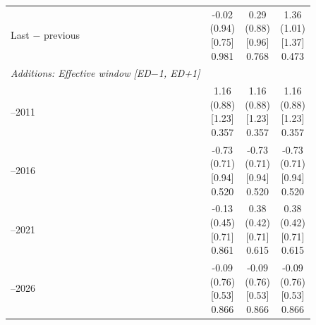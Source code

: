 \begin{threeparttable}
\begin{tabular}{@{}lccc}
\addlinespace[0.25ex]
\addlinespace[0.25ex]
Last $-$ previous & \makecell{-0.02\\(0.94)\\{}[0.75]\\{0.981}} & \makecell{0.29\\(0.88)\\{}[0.96]\\{0.768}} & \makecell{1.36\\(1.01)\\{}[1.37]\\{0.473}} \\
\addlinespace[0.25ex]
\midrule
\emph{Additions: Effective window [ED$-$1, ED+1]} \\
\addlinespace[0.25ex]
\addlinespace[1ex]
2007–2011 & \makecell{1.16\\(0.88)\\{}[1.23]\\{0.357}} & \makecell{1.16\\(0.88)\\{}[1.23]\\{0.357}} & \makecell{1.16\\(0.88)\\{}[1.23]\\{0.357}} \\
\addlinespace[0.25ex]
\addlinespace[0.25ex]
2012–2016 & \makecell{-0.73\\(0.71)\\{}[0.94]\\{0.520}} & \makecell{-0.73\\(0.71)\\{}[0.94]\\{0.520}} & \makecell{-0.73\\(0.71)\\{}[0.94]\\{0.520}} \\
\addlinespace[0.25ex]
\addlinespace[0.25ex]
2017–2021 & \makecell{-0.13\\(0.45)\\{}[0.71]\\{0.861}} & \makecell{0.38\\(0.42)\\{}[0.71]\\{0.615}} & \makecell{0.38\\(0.42)\\{}[0.71]\\{0.615}} \\
\addlinespace[0.25ex]
\addlinespace[0.25ex]
2022–2026 & \makecell{-0.09\\(0.76)\\{}[0.53]\\{0.866}} & \makecell{-0.09\\(0.76)\\{}[0.53]\\{0.866}} & \makecell{-0.09\\(0.76)\\{}[0.53]\\{0.866}} \\

\end{tabular}
\end{threeparttable}
